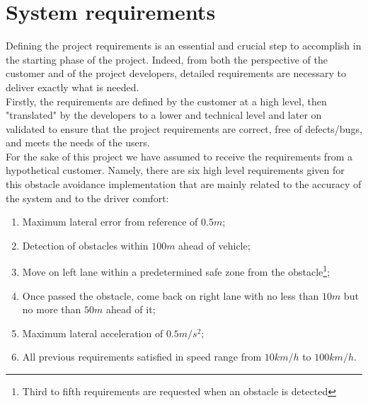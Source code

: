\section{System requirements} \label{System_Requirements}


Defining the project requirements is an essential and crucial step to accomplish in the starting phase of the project. Indeed, from both the perspective of the customer and of the project developers, detailed requirements are necessary to deliver exactly what is needed.\\
Firstly, the requirements are defined by the customer at a high level, then "translated" by the developers to a lower and technical level and later on validated to ensure that the project requirements are correct, free of defects/bugs, and meets the needs of the users.\\
For the sake of this project we have assumed to receive the requirements from a hypothetical customer.
Namely, there are six high level requirements given for this obstacle avoidance implementation that are mainly related to the accuracy of the system and to the driver comfort:
\begin{enumerate}
    \item Maximum lateral error from reference of $0.5 m$;
    \item Detection of obstacles within $100 m$ ahead of vehicle;
    \item Move on left lane within a predetermined safe zone from the obstacle\footnote{Third to fifth requirements are requested when an obstacle is detected};
    \item Once passed the obstacle, come back on right lane with no less than $10 m$ but no more than $50 m$ ahead of it;
    \item Maximum lateral acceleration of $0.5 m/s^2$;
    \item All previous requirements satisfied in speed range from $10 km/h$ to $100 km/h$.
\end{enumerate}
